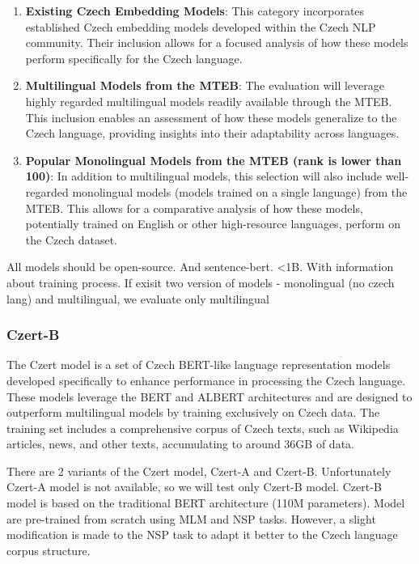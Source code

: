 \begin{enumerate}
  \item \textbf{Existing Czech Embedding Models}: This category incorporates established Czech embedding models developed within the Czech NLP community. Their inclusion allows for a focused analysis of how these models perform specifically for the Czech language.
  \item \textbf{Multilingual Models from the \ac{MTEB}}: The evaluation will leverage highly regarded multilingual models readily available through the \ac{MTEB}. This inclusion enables an assessment of how these models generalize to the Czech language, providing insights into their adaptability across languages.
  \item \textbf{Popular Monolingual Models from the \ac{MTEB} (rank is lower than 100)}: In addition to multilingual models, this selection will also include well-regarded monolingual models (models trained on a single language) from the \ac{MTEB}. This allows for a comparative analysis of how these models, potentially trained on English or other high-resource languages, perform on the Czech dataset.
\end{enumerate}

All models should be open-source. And sentence-bert. <1B. With information about training process.
If exisit two version of models - monolingual (no czech lang) and multilingual, we evaluate only multilingual

\subsubsection{Czert-B} \label{modelczert-b}

The Czert model \cite{czert} is a set of Czech \ac{BERT}-like language representation models developed specifically to enhance performance in processing the Czech language.
These models leverage the \ac{BERT} and \ac{ALBERT} \cite{ALBERT} architectures and are designed to outperform multilingual models by training exclusively on Czech data.
The training set includes a comprehensive corpus of Czech texts, such as Wikipedia articles, news, and other texts, accumulating to around 36GB of data.

There are 2 variants of the Czert model, Czert-A and Czert-B. Unfortunately Czert-A model is not available, so we will test only Czert-B model.
Czert-B model is based on the traditional \ac{BERT} architecture (110M parameters).
Model are pre-trained from scratch using \ac{MLM} and \ac{NSP} tasks. However, a slight modification is made to the \ac{NSP} task to adapt it better to the Czech language corpus structure.

